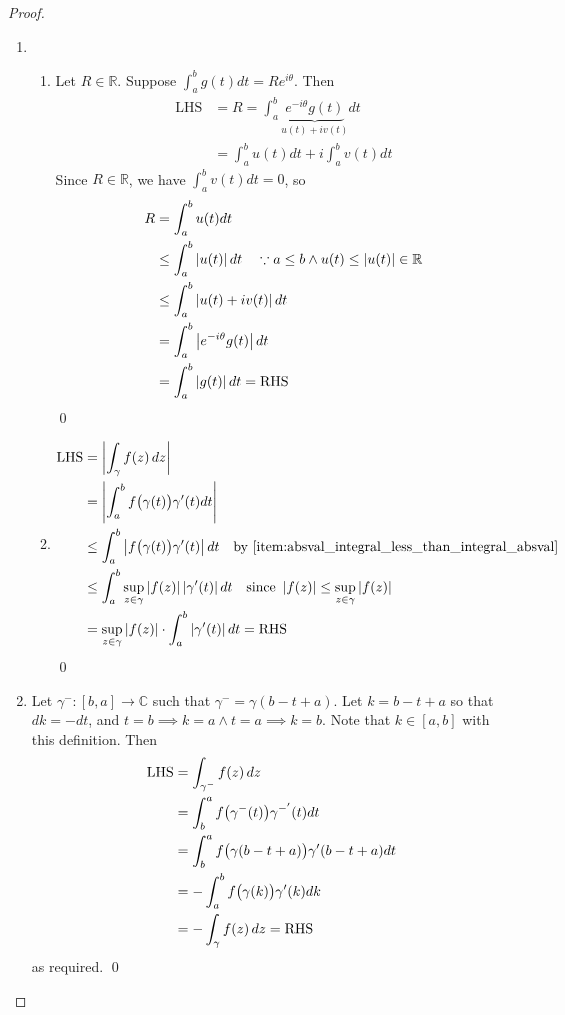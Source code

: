 \documentclass[notoc,notitlepage]{tufte-book}
\begin{document}
\begin{proof}
\begin{enumerate}
		\item \begin{enumerate}
			\item Let $R \in \mathbb{R}$. Suppose $\int_{a}^{b} g(t) dt = Re^{i \theta}$. Then
				\begin{align*}
					\text{LHS} &= R = \int_{a}^{b} \underbrace{e^{-i \theta} g(t)}_{u(t) + iv(t)} dt \\
						&= \int_{a}^{b} u(t) dt + i \int_{a}^{b} v(t) dt
				\end{align*}
				Since $R \in \mathbb{R}$, we have $\int_{a}^{b} v(t) dt = 0$, so
				\begin{align*}
					R &= \int_{a}^{b} u(t) dt \\
					  &\leq \int_{a}^{b} \left|u(t)\right| dt \quad \because a \leq b \land u(t) \leq \left|u(t)\right| \in \mathbb{R} \\
					  &\leq \int_{a}^{b} \left|u(t) + iv(t)\right| dt \\
					  &= \int_{a}^{b} \left|e^{-i \theta} g(t)\right| \mathop{}\!d{t} \\
					  &= \int_{a}^{b} \left|g(t)\right| dt = \text{RHS}
				\end{align*} \qed
			\item \begin{align*}
					\text{LHS} &= \abs{\int_{\gamma} f(z) \dif{z}} \\
						&= \abs{\int_{a}^{b} f\big( \gamma(t) \big) \gamma'(t) dt} \\
						&\leq \int_{a}^{b} \abs{f\big( \gamma(t) \big) \gamma'(t)} dt \quad \text{by } \cref{item:absval_integral_less_than_integral_absval} \\
						&\leq \int_{a}^{b} \sup_{z \in \gamma} \abs{f(z)} \abs{\gamma'(t)} dt \quad \text{since } \abs{f(z)} \leq \sup_{z \in \gamma} \abs{f(z)} \\
						&= \sup_{z \in \gamma} \abs{f(z)} \cdot \int_{a}^{b} \abs{\gamma'(t)} dt = \text{RHS}
				\end{align*}\qed
		\end{enumerate}
		\item Let $\gamma^-: [b, a] \to \mathbb{C}$ such that $\gamma^- = \gamma(b - t + a)$. Let $k = b - t + a$ so that $dk = -dt$, and $t = b \implies k = a \land t = a \implies k = b$. Note that $k \in [a, b]$ with this definition. Then
			\begin{align*}
				\text{LHS} &= \int_{\gamma^-} f(z) \mathop{}\!d{z} \\
					&= \int_{b}^{a} f\big( \gamma^- (t) \big) \gamma^{-'}(t) dt \\
					&= \int_{b}^{a} f\big( \gamma(b - t + a) \big) \gamma'(b - t + a) dt \\
					&= - \int_{a}^{b} f\big(\gamma(k)\big) \gamma'(k) dk \\
					&= - \int_{\gamma} f(z) \mathop{}\!d{z} = \text{RHS}
			\end{align*}
			as required. \qed
	\end{enumerate}
\end{proof}
\end{document}
